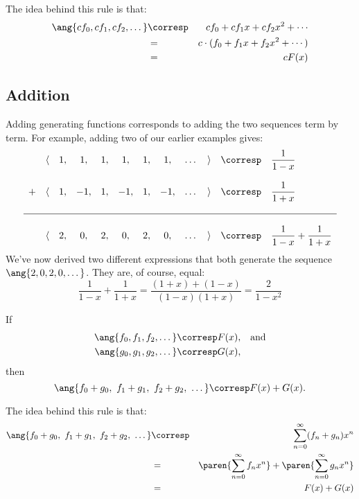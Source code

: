 The idea behind this rule is that:
\begin{eqnarray*}
\ang{c f_0, c f_1, c f_2, \dots}
    & \corresp & c f_0 + c f_1 x + c f_2 x^2 + \cdots \\
    & = & c \cdot (f_0 + f_1 x + f_2 x^2 + \cdots) \\
    & = & c F(x)
\end{eqnarray*}

\subsection{Addition}

Adding generating functions corresponds to adding the two sequences
term by term.  For example, adding two of our earlier examples gives:
%
\[
\begin{array}{cccccccccccl}
  & \langle & 1, & 1, & 1, & 1, & 1, & 1, & \dots & \rangle &
    \corresp & \dfrac{1}{1-x} \\
\\
+ & \langle & 1, & -1, & 1, & -1, & 1, & -1, & \dots & \rangle &
    \corresp & \dfrac{1}{1+x} \\
\\
\hline
\\
& \langle & 2, & 0, & 2, & 0, & 2, & 0, & \dots & \rangle &
    \corresp & \dfrac{1}{1-x} + \dfrac{1}{1+x}
\end{array}
\]
%
We've now derived two different expressions that both generate the
sequence $\ang{2, 0, 2, 0, \dots}$.  They are, of course, equal:
%
\[
\frac{1}{1-x} + \frac{1}{1+x} = \frac{(1 + x) + (1 - x)}{(1-x)(1+x)} = \frac{2}{1-x^2}
\]

\begin{mathrule}
\label{rule:addition}
If
%
\begin{align*}
\ang{f_0, f_1, f_2, \dots} & \corresp F(x), & \text{and} \\
\ang{g_0, g_1, g_2, \dots} & \corresp G(x),
\end{align*}
%
then
%
\[
\ang{f_0 + g_0,\ f_1 + g_1,\ f_2 + g_2,\ \dots}
    \corresp F(x) + G(x).
\]
\end{mathrule}

The idea behind this rule is that:
\begin{eqnarray*}
\ang{f_0 + g_0,\ f_1 + g_1,\ f_2 + g_2,\ \dots}
    & \corresp & \sum_{n=0}^\infty (f_n + g_n) x^n \\
    & = & \paren{\sum_{n=0}^\infty f_n x^n} +
        \paren{\sum_{n=0}^\infty g_n x^n} \\
    & = & F(x) + G(x)
\end{eqnarray*}

